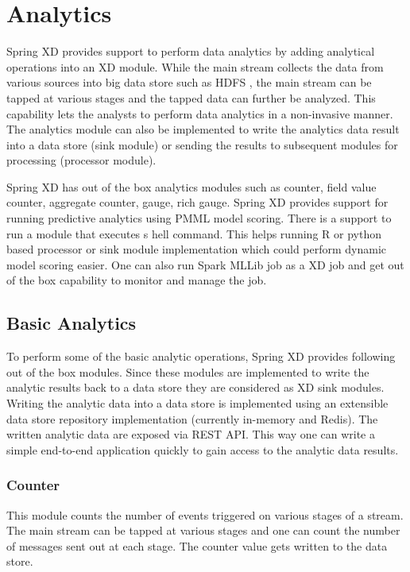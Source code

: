 \section{Analytics}

Spring XD provides support to perform data analytics by adding analytical operations into 
an XD module. While the main stream collects the data from various sources into big data 
store such as HDFS , the main stream can be tapped at various stages and the tapped data 
can further be analyzed. This capability lets the analysts to perform data analytics in a
non-invasive manner. The analytics module can also be implemented to write the analytics 
data result into a data store (sink module) or sending the results to subsequent modules 
for processing (processor module). 

\par

Spring XD has out of the box analytics modules such as counter, field value counter, 
aggregate counter, gauge, rich gauge. Spring XD provides support for running predictive 
analytics using PMML model scoring. There is a support to run a module that executes s
hell command. This helps running R or python based processor or sink module implementation
 which could perform dynamic model scoring easier. One can also run Spark MLLib job as a 
 XD job and get out of the box capability to monitor and manage the job.

\subsection {Basic Analytics}

To perform some of the basic analytic operations, Spring XD provides following out of the 
box modules. Since these modules are implemented to write the analytic results back to a
data store they are considered as XD sink modules. Writing the analytic data into a data 
store is implemented using an extensible data store repository implementation 
(currently in-memory and Redis). The written analytic data are exposed via REST API. 
This way one can write a simple end-to-end application quickly to gain access to the 
analytic data results.

\subsubsection {Counter}

This module counts the number of events triggered on various stages of a stream. 
The main stream can be tapped at various stages and one can count the number of 
messages sent out at each stage. The counter value gets written to the data store.
 
